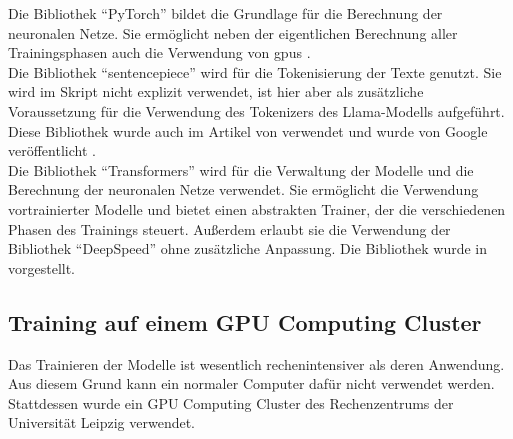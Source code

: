 Die Bibliothek \enquote{PyTorch} bildet die Grundlage für die Berechnung der neuronalen Netze.
Sie ermöglicht neben der eigentlichen Berechnung aller Trainingsphasen auch die Verwendung von \ac{gpu}s \citep{pytorch}.\\

Die Bibliothek \enquote{sentencepiece} wird für die Tokenisierung der Texte genutzt.
Sie wird im Skript nicht explizit verwendet, ist hier aber als zusätzliche Voraussetzung für die Verwendung des Tokenizers des Llama-Modells aufgeführt.
Diese Bibliothek wurde auch im Artikel von \citet{llama} verwendet und wurde von Google veröffentlicht \citep{sentencepiece}.\\

Die Bibliothek \enquote{Transformers} wird für die Verwaltung der Modelle und die Berechnung der neuronalen Netze verwendet.
Sie ermöglicht die Verwendung vortrainierter Modelle und bietet einen abstrakten Trainer, der die verschiedenen Phasen des Trainings steuert.
Außerdem erlaubt sie die Verwendung der Bibliothek \enquote{DeepSpeed} ohne zusätzliche Anpassung.
Die Bibliothek wurde in \citet{transformers} vorgestellt.\\

\subsection{Training auf einem GPU Computing Cluster}\label{sec:training-cluster}
Das Trainieren der Modelle ist wesentlich rechenintensiver als deren Anwendung.
Aus diesem Grund kann ein normaler Computer dafür nicht verwendet werden.
Stattdessen wurde ein GPU Computing Cluster des Rechenzentrums der Universität Leipzig verwendet.\\

